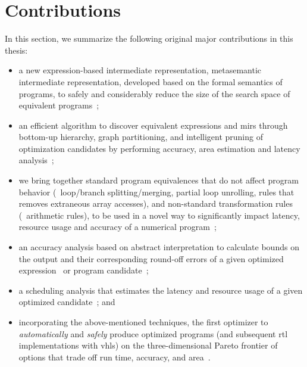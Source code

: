 \section{Contributions}
\label{intro:sec:contributions}

In this section, we summarize the following original major contributions in
this thesis:
\begin{itemize}

    \item a new expression-based intermediate representation, metasemantic
    intermediate representation, developed based on the formal semantics of
    programs, to safely and considerably reduce the size of the search space of
    equivalent programs~\cite{soap2};

    \item an efficient algorithm to discover equivalent expressions and
    \glspl{mir} through bottom-up hierarchy, graph partitioning, and
    intelligent pruning of optimization candidates by performing accuracy, area
    estimation and latency analysis~\cite{soap};

    \item we bring together standard program equivalences that do not affect
    program behavior (\eg~loop/branch splitting/merging, partial loop
    unrolling, rules that removes extraneous array accesses), and non-standard
    transformation rules (\eg~arithmetic rules), to be used in a novel way to
    significantly impact latency, resource usage and accuracy of a numerical
    program~\cite{soap3};

    \item an accuracy analysis based on abstract interpretation to calculate
    bounds on the output and their corresponding round-off errors of a given
    optimized expression~\cite{soap} or program candidate~\cite{soap2};

    \item a scheduling analysis that estimates the latency and resource usage
    of a given optimized candidate~\cite{soap3}; and

    \item incorporating the above-mentioned techniques, the first optimizer
    to \emph{automatically} and \emph{safely} produce optimized programs
    (and subsequent \gls{rtl} implementations with \gls{vhls}) on the
    three-dimensional Pareto frontier of options that trade off run time,
    accuracy, and area~\cite{soap3}.

\end{itemize}
